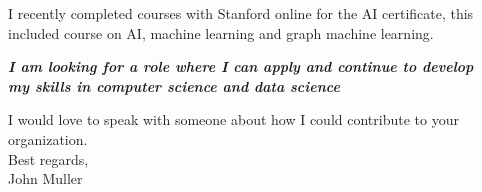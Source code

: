 \documentclass{article}
\begin{document}
I recently completed courses with Stanford online for the AI certificate, this included course on AI, machine learning and graph machine learning.

\vspace{0.1in}
\begin{center}
\textbf{\emph{I am  looking for a role where I can apply and  continue to develop \\
my skills in computer science and data science}}
\end{center}
\vspace{0.1in}

\noindent I would love to speak with someone about how I could contribute to your organization.\\
Best regards,\\
John Muller
\end{document}
